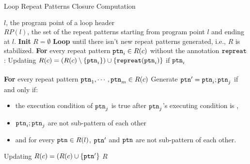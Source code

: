 %
\begin{algorithm}
\caption{
{Loop Repeat Patterns Closure Computation}
\label{alg:loop-repeat-pattern}
}
\begin{algorithmic}[1]
\REQUIRE $l$, the program point of a loop header
\\ \quad
$RP(l)$, the set of the repeat patterns starting from program point $l$ and ending at $l$.
\STATE  \textbf{Init} $R = \emptyset$
\STATE  \textbf{Loop} until there isn't new repeat patterns generated, i.e., $R$ is stabilized.
\STATE  \quad \textbf{For} every repeat pattern $\mathtt{ptn}_i \in R(c)$ without the annotation $\mathtt{repreat}$:
\STATE  \quad \quad Updating $R(c) = (R(c) \setminus \{\mathtt{ptn}_{i}\}) \cup \{\mathtt{repreat}(\mathtt{ptn}_i)\}$
if $\mathtt{ptn}_i$ 
\\ \quad \quad {}
\\ \quad \quad 
{}
\STATE  \quad \textbf{For} every repeat pattern $\mathtt{ptn}_1, \cdots, \mathtt{ptn}_m \in R(c)$
\STATE \quad \quad  Generate $\mathtt{ptn}' = \mathtt{ptn}_{i}; \mathtt{ptn}_{j} $ 
if and only if:
\begin{itemize}
  \item  the execution condition of $\mathtt{ptn}_{j}$
is true after $\mathtt{ptn}_{j}$'s executing condition is , 
\item   $\mathtt{ptn}_{i}; \mathtt{ptn}_{j}$ are not sub-pattern of each other
\item  and for every $\mathtt{ptn} \in R(l)$, $\mathtt{ptn}'$ and $\mathtt{ptn}$ are not sub-pattern of each other.
\end{itemize}
\STATE  \quad \quad Updating $R(c) = (R(c) \cup \{\mathtt{ptn}'\}$
\RETURN $R$
\end{algorithmic}
\end{algorithm}
%
